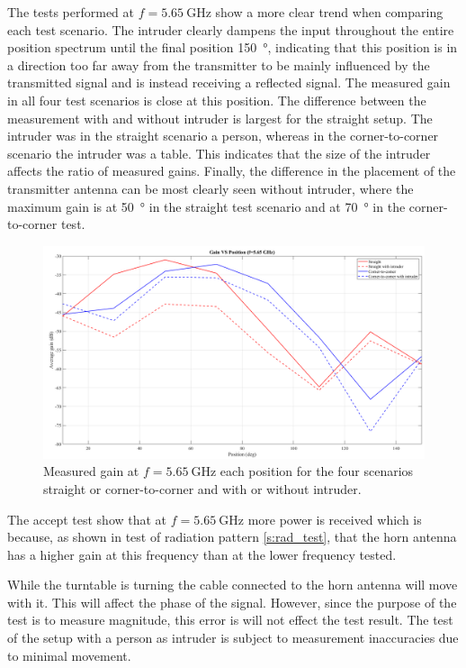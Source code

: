 The tests performed at $f=\SI{5.65}{\giga\hertz}$ show a more clear trend when comparing each test scenario. The intruder clearly dampens the input throughout the entire position spectrum until the final position \SI{150}{\degree}, indicating that this position is in a direction too far away from the transmitter to be mainly influenced by the transmitted signal and is instead receiving a reflected signal. The measured gain in all four test scenarios is close at this position. The difference between the measurement with and without intruder is largest for the straight setup. The intruder was in the straight scenario a person, whereas in the corner-to-corner scenario the intruder was a table. This indicates that the size of the intruder affects the ratio of measured gains. Finally, the difference in the placement of the transmitter antenna can be most clearly seen without intruder, where the maximum gain is at \SI{50}{\degree} in the straight test scenario and at \SI{70}{\degree} in the corner-to-corner test. 

\begin{figure}[H]
    \centering
    \includegraphics[width=1\textwidth]{figures/gain_vs_pos_565.png}
    \caption{Measured gain at $f=\SI{5.65}{\giga\hertz}$ each position for the four scenarios straight or corner-to-corner and with or without intruder.} 
    \label{fig:gain_vs_pos_565}
\end{figure}

The accept test show that at $f=\SI{5.65}{\giga\hertz}$ more power is received which is because, as shown in test of radiation pattern \ref{s:rad_test}, that the horn antenna has a higher gain at this frequency than at the lower frequency tested. 

While the turntable is turning the cable connected to the horn antenna will move with it. This will affect the phase of the signal. However, since the purpose of the test is to measure magnitude, this error is will not effect the test result. The test of the setup with a person as intruder is subject to measurement inaccuracies due to minimal movement.